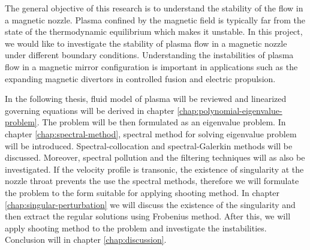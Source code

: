 The general objective of this research is to understand the stability of the flow in a magnetic nozzle. Plasma confined by the magnetic field is typically far from the state of the thermodynamic equilibrium which makes it unstable. In this project, we would like to investigate the stability of plasma flow in a magnetic nozzle under different boundary conditions. Understanding the instabilities of plasma flow in a magnetic mirror configuration is important in applications such as the expanding magnetic divertors in controlled fusion and electric propulsion. \cite{ryutov_divertor_2016,kaganovich_2020_physics}

In the following thesis, fluid model of plasma will be reviewed and linearized governing equations will be derived in chapter \ref{chap:polynomial-eigenvalue-problem}. The problem will be then formulated as an eigenvalue problem. In chapter \ref{chap:spectral-method}, spectral method for solving eigenvalue problem will be introduced. Spectral-collocation and spectral-Galerkin methods will be discussed. Moreover, spectral pollution and the filtering techniques will as also be investigated. If the velocity profile is transonic, the existence of singularity at the nozzle throat prevents the use the spectral methods, therefore we will formulate the problem to the form suitable for applying shooting method. In chapter \ref{chap:singular-perturbation} we will discuss the existence of the singularity and then extract the regular solutions using Frobenius method. After this, we will apply shooting method to the problem and investigate the instabilities. Conclusion will in chapter \ref{chap:discussion}.

